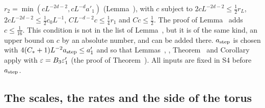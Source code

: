 \begin{detail}
\begin{step}
$r_2=\min(cL^{-2d-2},cL^{-d}a'_1)$ (Lemma~), with $c$ subject to $2cL^{-2d-2}\le\frac12r_L$, $2cL^{-2d-2}\le\frac12c_0L^{-1}$, $CL^{-d-2}c\le\frac14r_1$ and $Cc\le\frac12$. The proof of Lemma~ adds $c\le\frac1{16}$. This condition is not in the list of Lemma~, but it is of the same kind, an upper bound on $c$ by an absolute number, and can be added there. $a_{\rm step}$ is chosen with $4(C_*+1)L^{-2}a_{\rm step}\le a'_1$ and so that Lemmas~, , Theorem~ and Corollary~ apply with $\varepsilon=B_3\varepsilon'_1$ (the proof of Theorem~). All inputs are fixed in S4 before $a_{\rm step}$.
\end{step}
\end{detail}

\subsection{The scales, the rates and the side of the torus}\label{subsec:ledger-scales}

